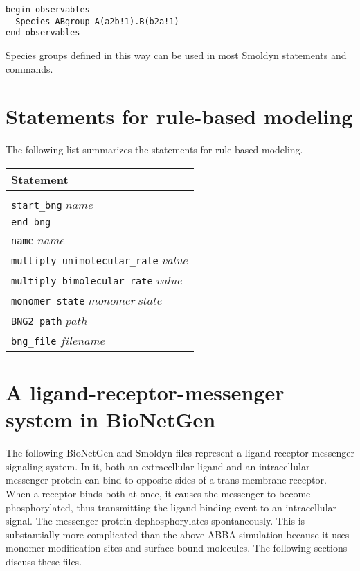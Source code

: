 \documentclass {scrbook}
\newcommand {\ttt} {\texttt}
\begin{document}
\begin{lstlisting}[style=SSAC]
begin observables
  Species ABgroup A(a2b!1).B(b2a!1)
end observables
\end{lstlisting}

Species groups defined in this way can be used in most Smoldyn statements and commands.

\section{Statements for rule-based modeling}

The following list summarizes the statements for rule-based modeling.

\begin{longtable}[c]{l}
Statement\\
\hline\\
\ttt{start\_bng} $name$\\
\ttt{end\_bng}\\
\ttt{name} $name$\\
\ttt{multiply unimolecular\_rate} $value$\\
\ttt{multiply bimolecular\_rate} $value$\\
\ttt{monomer\_state} $monomer\ state$\\
\ttt{BNG2\_path} $path$\\
\ttt{bng\_file} $filename$
\end{longtable}

\section{A ligand-receptor-messenger system in BioNetGen}

The following BioNetGen and Smoldyn files represent a ligand-receptor-messenger signaling system. In it, both an extracellular ligand and an intracellular messenger protein can bind to opposite sides of a trans-membrane receptor. When a receptor binds both at once, it causes the messenger to become phosphorylated, thus transmitting the ligand-binding event to an intracellular signal. The messenger protein dephosphorylates spontaneously. This is substantially more complicated than the above ABBA simulation because it uses monomer modification sites and surface-bound molecules. The following sections discuss these files.
\end{document}
